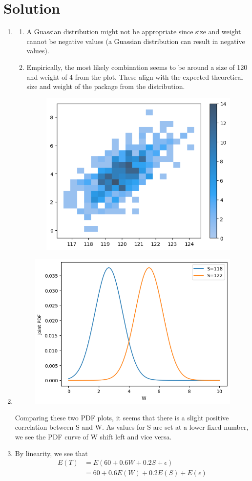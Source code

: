 \documentclass{../harvardml}
\theoremstyle{definition}
\theoremstyle{plain}
\newenvironment{solution}
  {\color{blue}\section*{Solution}}
{}
\begin{document}
\newpage

\begin{solution}
	\begin{enumerate}
	    \item \begin{enumerate}
	        \item A Guassian distribution might not be appropriate since size and weight cannot be negative values (a Guassian distribution can result in negative values).
                \item Empirically, the most likely combination seems to be around a size of 120 and weight of 4 from the plot. These align with the expected theoretical size and weight of the package from the distribution.
                \begin{figure}[H]
                    \centering
                    \includegraphics[width=0.35\linewidth]{histplot.png}
                \end{figure}
	    \end{enumerate}
        \item 
        \begin{figure}[H]
	    \centering
	    \includegraphics[width=0.35\linewidth]{fixed_s.png}
	\end{figure}
        Comparing these two PDF plots, it seems that there is a slight positive correlation between S and W. As values for S are set at a lower fixed number, we see the PDF curve of W shift left and vice versa.
        \item By linearity, we see that
        \begin{align*}
            E(T) &= E(60 + 0.6W + 0.2S + \epsilon) \\
            &= 60 + 0.6E(W) + 0.2E(S) + E(\epsilon) \\

\end{align*}
\end{enumerate}
\end{solution}
\end{document}
